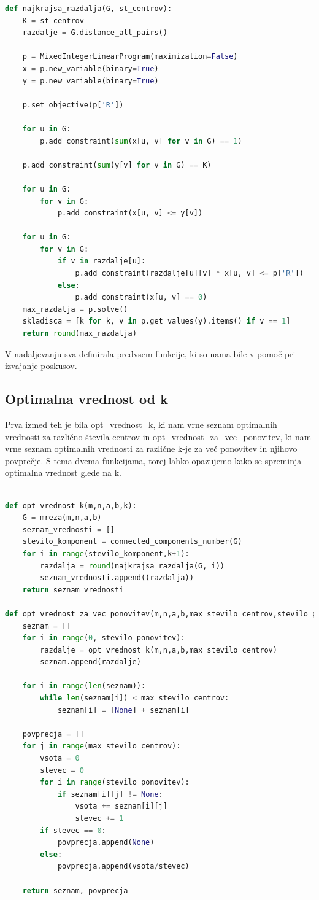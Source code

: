 \documentclass[a4paper]{article}
\begin{document}
\begin{lstlisting}[language=Python]
def najkrajsa_razdalja(G, st_centrov):
    K = st_centrov
    razdalje = G.distance_all_pairs()

    p = MixedIntegerLinearProgram(maximization=False)
    x = p.new_variable(binary=True)
    y = p.new_variable(binary=True)

    p.set_objective(p['R'])

    for u in G:
        p.add_constraint(sum(x[u, v] for v in G) == 1)
       
    p.add_constraint(sum(y[v] for v in G) == K)

    for u in G:
        for v in G:
            p.add_constraint(x[u, v] <= y[v])

    for u in G:
        for v in G:
            if v in razdalje[u]:
                p.add_constraint(razdalje[u][v] * x[u, v] <= p['R'])
            else:
                p.add_constraint(x[u, v] == 0)
    max_razdalja = p.solve()
    skladisca = [k for k, v in p.get_values(y).items() if v == 1]
    return round(max_razdalja)
\end{lstlisting}

V nadaljevanju sva definirala predvsem funkcije, ki so nama bile v pomoč pri izvajanje poskusov.


\subsection{Optimalna vrednost od k}
Prva izmed teh je bila opt\_vrednost\_k, ki nam vrne seznam optimalnih vrednosti za različno števila centrov in opt\_vrednost\_za\_vec\_ponovitev, ki nam vrne seznam optimalnih vrednosti za različne k-je za več ponovitev in njihovo povprečje. S tema dvema funkcijama, torej lahko opazujemo kako se spreminja optimalna vrednost glede na k.


\begin{lstlisting}[language=Python]

def opt_vrednost_k(m,n,a,b,k):
    G = mreza(m,n,a,b)
    seznam_vrednosti = []
    stevilo_komponent = connected_components_number(G)
    for i in range(stevilo_komponent,k+1):
        razdalja = round(najkrajsa_razdalja(G, i))
        seznam_vrednosti.append((razdalja))
    return seznam_vrednosti

def opt_vrednost_za_vec_ponovitev(m,n,a,b,max_stevilo_centrov,stevilo_ponovitev):
    seznam = []
    for i in range(0, stevilo_ponovitev):
        razdalje = opt_vrednost_k(m,n,a,b,max_stevilo_centrov)
        seznam.append(razdalje)

    for i in range(len(seznam)):
        while len(seznam[i]) < max_stevilo_centrov:
            seznam[i] = [None] + seznam[i]

    povprecja = []
    for j in range(max_stevilo_centrov):
        vsota = 0
        stevec = 0
        for i in range(stevilo_ponovitev):
            if seznam[i][j] != None:
                vsota += seznam[i][j]
                stevec += 1
        if stevec == 0:
            povprecja.append(None)
        else:
            povprecja.append(vsota/stevec)

    return seznam, povprecja
\end{lstlisting}
\end{document}
